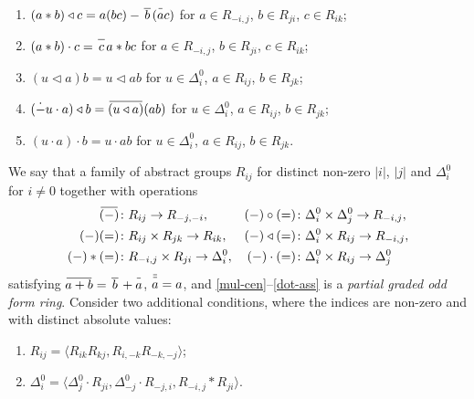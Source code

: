 \documentclass{article}
\theoremstyle{definition}
\newcommand{\dotminus}{\mathbin{\dot{-}}}
\newcommand{\inv}[1]{
    \!\;\overline{
        \!\!\:#1\vphantom !\!\!\:
    }\;\!
}
\begin{document}
\begin{enumerate}[label = {(R\arabic*)}]
    \item \label{tri-str} \(
        (a * b) \triangleleft c
        =
        a(bc)
        - \inv{\, b \,} (\inv ac)
    \) for \(a \in R_{-i, j}\), \(b \in R_{ji}\), \(c \in R_{ik}\);

    \item \label{dot-str} \(
        (a * b) \cdot c = \inv{\,c\,} a * bc
    \) for \(a \in R_{-i, j}\), \(b \in R_{ji}\), \(c \in R_{ik}\);

    \item \label{tri-ass} \(
        (u \triangleleft a) b = u \triangleleft ab
    \) for \(u \in \Delta^0_i\), \(a \in R_{ij}\), \(b \in R_{jk}\);

    \item \label{tri-dot} \(
        (\dotminus u \cdot a) \triangleleft b
        =
        \inv{(u \triangleleft a)} (ab)
    \) for \(u \in \Delta^0_i\), \(a \in R_{ij}\), \(b \in R_{jk}\);

    \item \label{dot-ass} \(
        (u \cdot a) \cdot b = u \cdot ab
    \) for \(u \in \Delta^0_i\), \(a \in R_{ij}\), \(b \in R_{jk}\).

\end{enumerate}

We say that a family of abstract groups \(R_{ij}\) for distinct non-zero \(|i|\), \(|j|\) and \(\Delta^0_i\) for \(i \neq 0\) together with operations
\begin{align*}
    \inv{(-)} &\colon R_{ij} \to R_{-j, -i},
    &
    ({-}) \circ ({=})
    &\colon \Delta^0_i \times \Delta^0_j
    \to R_{-i, j},
    \\
    ({-})({=})
    &\colon R_{ij} \times R_{jk}
    \to R_{ik},
    &
    ({-}) \triangleleft ({=})
    &\colon \Delta^0_i \times R_{ij}
    \to R_{-i, j},
    \\
    ({-}) * ({=})
    &\colon R_{-i, j} \times R_{ji}
    \to \Delta^0_i,
    &
    ({-}) \cdot ({=})
    &\colon \Delta^0_i \times R_{ij}
    \to \Delta^0_j
\end{align*}
satisfying \(\inv{a + b} = \inv{\,b\,} + \inv a\), \(\inv{\inv a} = a\), and \ref{mul-cen}--\ref{dot-ass} is a \textit{partial graded odd form ring}. Consider two additional conditions, where the indices are non-zero and with distinct absolute values:
\begin{enumerate}[label = {(R\arabic*)}, start = 29]

    \item \label{long-idem} \(
        R_{ij} = \langle
            R_{ik} R_{kj},
            R_{i, -k} R_{-k, -j}
        \rangle
    \);

    \item \label{short-idem} \(
        \Delta^0_i = \langle
            \Delta^0_j \cdot R_{ji},
            \Delta^0_{-j} \cdot R_{-j, i},
            R_{-i, j} * R_{ji}
        \rangle
    \).

\end{enumerate}
\end{document}
